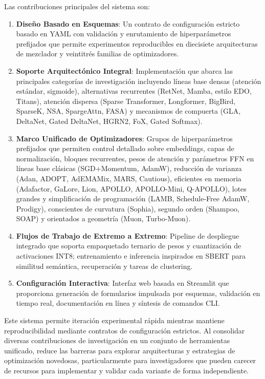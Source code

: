 \documentclass[11pt,a4paper]{article}
\begin{document}
Las contribuciones principales del sistema son:
\begin{enumerate}[leftmargin=*]
    \item \textbf{Diseño Basado en Esquemas}: Un contrato de configuración estricto basado en YAML con validación y enrutamiento de hiperparámetros prefijados que permite experimentos reproducibles en diecisiete arquitecturas de mezclador y veintitrés familias de optimizadores.
    \item \textbf{Soporte Arquitectónico Integral}: Implementación que abarca las principales categorías de investigación incluyendo líneas base densas (atención estándar, sigmoide), alternativas recurrentes (RetNet, Mamba, estilo EDO, Titans), atención dispersa (Sparse Transformer, Longformer, BigBird, SparseK, NSA, SpargeAttn, FASA) y mecanismos de compuerta (GLA, DeltaNet, Gated DeltaNet, HGRN2, FoX, Gated Softmax).
    \item \textbf{Marco Unificado de Optimizadores}: Grupos de hiperparámetros prefijados que permiten control detallado sobre embeddings, capas de normalización, bloques recurrentes, pesos de atención y parámetros FFN en líneas base clásicas (SGD+Momentum, AdamW), reducción de varianza (Adan, ADOPT, AdEMAMix, MARS, Cautious), eficientes en memoria (Adafactor, GaLore, Lion, APOLLO, APOLLO-Mini, Q-APOLLO), lotes grandes y simplificación de programación (LAMB, Schedule-Free AdamW, Prodigy), conscientes de curvatura (Sophia), segundo orden (Shampoo, SOAP) y orientados a geometría (Muon, Turbo-Muon).
    \item \textbf{Flujos de Trabajo de Extremo a Extremo}: Pipeline de despliegue integrado que soporta empaquetado ternario de pesos y cuantización de activaciones INT8; entrenamiento e inferencia inspirados en SBERT para similitud semántica, recuperación y tareas de clustering.
    \item \textbf{Configuración Interactiva}: Interfaz web basada en Streamlit que proporciona generación de formularios impulsada por esquemas, validación en tiempo real, documentación en línea y síntesis de comandos CLI.
\end{enumerate}

Este sistema permite iteración experimental rápida mientras mantiene reproducibilidad mediante contratos de configuración estrictos. Al consolidar diversas contribuciones de investigación en un conjunto de herramientas unificado, reduce las barreras para explorar arquitecturas y estrategias de optimización novedosas, particularmente para investigadores que pueden carecer de recursos para implementar y validar cada variante de forma independiente.
\end{document}
